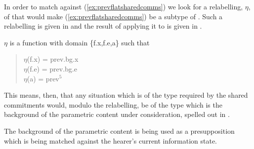 In order to match \preveg{} against (\ref{ex:prevflatsharedcomms}) we look
for a relabelling, $\eta$, of \preveg{} that would make
(\ref{ex:prevflatsharedcomms}) be a subtype of \preveg{}.  Such a
relabelling is given in  and the result of applying it to
\preveg{} is given in .
\begin{ex}
\begin{subex}
\item $\eta$ is a function with domain \{f.x,f.e,a\} such that
\begin{quote}
$\eta$(f.x) = prev.bg.x\\
$\eta$(f.e) = prev.bg.e\\
$\eta$(a) = prev$^5$
\end{quote}
 
\item {}
\end{subex}
\end{ex}
This means, then, that any situation which is of the type required by
the shared commitments would, modulo the relabelling, be of the type
which is the background of the parametric content under consideration,
spelled out in \nexteg{}.
\begin{ex}
 
\end{ex} 
The background of the parametric content is
being used as a presupposition which is being matched against the
hearer's current information state.

